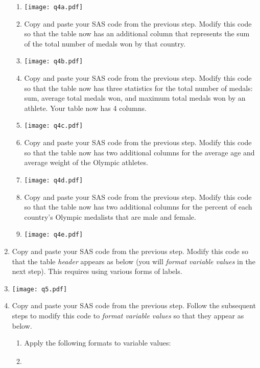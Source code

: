 \begin{enumerate}
\begin{enumerate}
\item[] \texttt{[image: q4a.pdf]}
\item Copy and paste your SAS code from the previous step.  Modify this code so that the table now has an additional column that represents the sum of the total number of medals won by that country.
\item[] \texttt{[image: q4b.pdf]}
\item Copy and paste your SAS code from the previous step.  Modify this code so that the table now has three statistics for the total number of medals: sum, average total medals won, and maximum total medals won by an athlete.  Your table now has 4 columns.
\item[] \texttt{[image: q4c.pdf]}
\item Copy and paste your SAS code from the previous step.  Modify this code so that the table now has two additional columns for the average age and average weight of the Olympic athletes.
\item[] \texttt{[image: q4d.pdf]}    
\item Copy and paste your SAS code from the previous step.  Modify this code so that the table now has two additional columns for the percent of each country's Olympic medalists that are male and female.
\item[] \texttt{[image: q4e.pdf]}
\end{enumerate}
\item Copy and paste your SAS code from the previous step.  Modify this code so that the table \emph{header} appears as below (you will \emph{format variable values} in the next step).  This requires using various forms of labels.
\item[] \texttt{[image: q5.pdf]}
\item Copy and paste your SAS code from the previous step.  Follow the subsequent steps to modify this code to \emph{format variable values} so that they appear as below.
\begin{enumerate}
    \item Apply the following formats to variable values:
    \item[]
    \begin{tabular}{rl}

\end{tabular}
\end{enumerate}
\end{enumerate}
